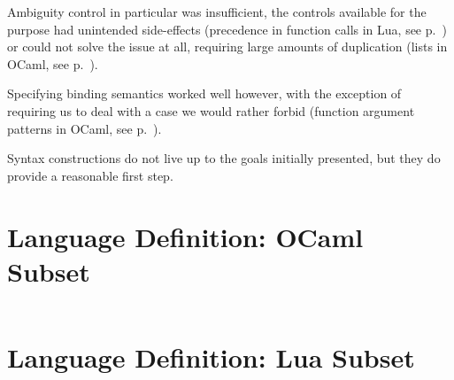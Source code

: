 \documentclass{kththesis}
\begin{document}
Ambiguity control in particular was insufficient, the controls available for the purpose had unintended side-effects (precedence in function calls in Lua, see p.~\pageref{sec:lua-func-call-precedence}) or could not solve the issue at all, requiring large amounts of duplication (lists in OCaml, see p.~\pageref{sec:ambiguous-lists}).

Specifying binding semantics worked well however, with the exception of requiring us to deal with a case we would rather forbid (function argument patterns in OCaml, see p.~\pageref{sec:ocaml-function-argument-patterns}).

Syntax constructions do not live up to the goals initially presented, but they do provide a reasonable first step.

\printbibliography[heading=bibintoc]

\appendix

\chapter{Language Definition: OCaml Subset} \label{sec:appendix-ocaml}

\inputminted{syncon}{implementation/languages/ocaml/language}

\chapter{Language Definition: Lua Subset} \label{sec:appendix-lua}

\inputminted{syncon}{implementation/languages/lua/language}
\end{document}
